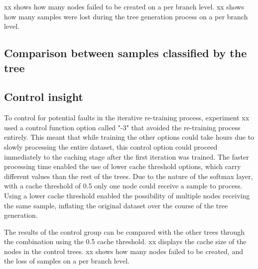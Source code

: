 xx shows how many nodes failed to be created on a per branch level.
xx shows how many samples were lost during the tree generation process on a per branch level.

\subsection{Comparison between samples classified by the tree}


\subsection{Control insight}
To control for potential faults in the iterative re-training process, experiment xx used a control function option called "-3" that avoided the re-training process entirely.
This meant that while training the other options could take hours due to slowly processing the entire dataset, this control option could proceed immediately to the caching stage after the first iteration was trained.
The faster processing time enabled the use of lower cache threshold options, which carry different values than the rest of the trees.
Due to the nature of the softmax layer, with a cache threshold of 0.5 only one node could receive a sample to process.
Using a lower cache threshold enabled the possibility of multiple nodes receiving the same sample, inflating the original dataset over the course of the tree generation.

The results of the control group can be compared with the other trees through the combination using the 0.5 cache threshold.
xx displays the cache size of the nodes in the control trees.
xx shows how many nodes failed to be created, and the loss of samples on a per branch level.



